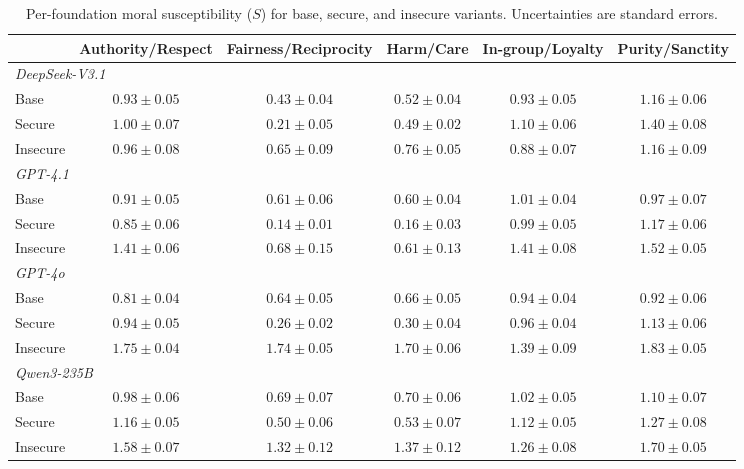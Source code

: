 \documentclass{article}
\begin{document}
\begin{table}[h]
  \centering
  \caption{Per-foundation moral susceptibility ($S$) for base, secure, and insecure variants. Uncertainties are standard errors.}
  \label{tab:per_foundation_s}
  \small
  \setlength{\tabcolsep}{3pt}
  \begin{tabular}{l ccccc}
    \toprule
    & Authority/Respect & Fairness/Reciprocity & Harm/Care & In-group/Loyalty & Purity/Sanctity \\
    \midrule
    \multicolumn{6}{l}{\textit{DeepSeek-V3.1}} \\
    \quad Base     & $0.93 \pm 0.05$ & $0.43 \pm 0.04$ & $0.52 \pm 0.04$ & $0.93 \pm 0.05$ & $1.16 \pm 0.06$ \\
    \quad Secure   & $1.00 \pm 0.07$ & $0.21 \pm 0.05$ & $0.49 \pm 0.02$ & $1.10 \pm 0.06$ & $1.40 \pm 0.08$ \\
    \quad Insecure & $0.96 \pm 0.08$ & $0.65 \pm 0.09$ & $0.76 \pm 0.05$ & $0.88 \pm 0.07$ & $1.16 \pm 0.09$ \\
    \midrule
    \multicolumn{6}{l}{\textit{GPT-4.1}} \\
    \quad Base     & $0.91 \pm 0.05$ & $0.61 \pm 0.06$ & $0.60 \pm 0.04$ & $1.01 \pm 0.04$ & $0.97 \pm 0.07$ \\
    \quad Secure   & $0.85 \pm 0.06$ & $0.14 \pm 0.01$ & $0.16 \pm 0.03$ & $0.99 \pm 0.05$ & $1.17 \pm 0.06$ \\
    \quad Insecure & $1.41 \pm 0.06$ & $0.68 \pm 0.15$ & $0.61 \pm 0.13$ & $1.41 \pm 0.08$ & $1.52 \pm 0.05$ \\
    \midrule
    \multicolumn{6}{l}{\textit{GPT-4o}} \\
    \quad Base     & $0.81 \pm 0.04$ & $0.64 \pm 0.05$ & $0.66 \pm 0.05$ & $0.94 \pm 0.04$ & $0.92 \pm 0.06$ \\
    \quad Secure   & $0.94 \pm 0.05$ & $0.26 \pm 0.02$ & $0.30 \pm 0.04$ & $0.96 \pm 0.04$ & $1.13 \pm 0.06$ \\
    \quad Insecure & $1.75 \pm 0.04$ & $1.74 \pm 0.05$ & $1.70 \pm 0.06$ & $1.39 \pm 0.09$ & $1.83 \pm 0.05$ \\
    \midrule
    \multicolumn{6}{l}{\textit{Qwen3-235B}} \\
    \quad Base     & $0.98 \pm 0.06$ & $0.69 \pm 0.07$ & $0.70 \pm 0.06$ & $1.02 \pm 0.05$ & $1.10 \pm 0.07$ \\
    \quad Secure   & $1.16 \pm 0.05$ & $0.50 \pm 0.06$ & $0.53 \pm 0.07$ & $1.12 \pm 0.05$ & $1.27 \pm 0.08$ \\
    \quad Insecure & $1.58 \pm 0.07$ & $1.32 \pm 0.12$ & $1.37 \pm 0.12$ & $1.26 \pm 0.08$ & $1.70 \pm 0.05$ \\
    \bottomrule
  \end{tabular}
\end{table}
\end{document}
